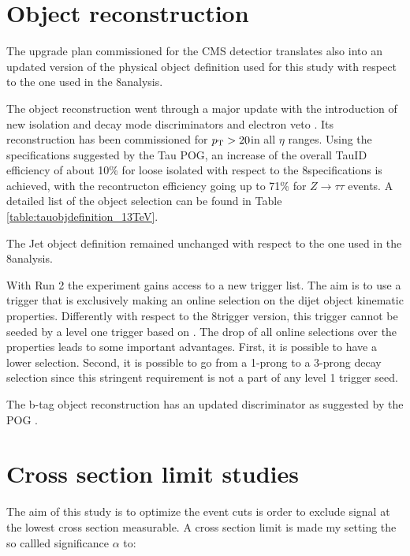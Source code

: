 \section{Object reconstruction}

The upgrade plan commissioned for the CMS detectior translates also into an updated version of the physical object definition used for this study with respect to the one used in the 8\tev analysis.

The \hadtau object reconstruction went through a major update with the introduction of new isolation and decay mode discriminators and electron veto \cite{bib:TauID_13tev}. Its reconstruction has been commissioned for $p_{\text{T}} > 20$\gev in all $\eta$ ranges. Using the specifications suggested by the Tau POG, an increase of the overall TauID efficiency of about 10\% for loose isolated \hadtau with respect to the 8\tev specifications is achieved, with the recontructon efficiency going up to 71\% for $Z \longrightarrow\tau\tau$ events\cite{bib:TauID_13tev}. A detailed list of the \hadtau object selection can be found in Table \ref{table:tauobjdefinition_13TeV}. 

The Jet object definition remained unchanged with respect to the one used in the 8\tev analysis.  

With Run 2 the experiment gains access to a new trigger list. The aim is to use a trigger that is exclusively making an online selection on the dijet object kinematic properties. Differently with respect to the 8\tev trigger version, this trigger cannot be seeded by a level one trigger based on \met. The drop of all online selections over the \hadtau properties leads to some important advantages. First, it is possible to have a lower \hadtau \pt selection. Second, it is possible to go from a 1-prong to a 3-prong decay selection since this stringent requirement is not a part of any level 1 trigger seed. 

The b-tag object reconstruction has an updated discriminator as suggested by the POG \cite{bib:BJetID_13tev}.

\section{Cross section limit studies}

The aim of this study is to optimize the event cuts is order to exclude signal at the lowest cross section measurable. A cross section limit is made my setting the so callled significance $\alpha$ to:

